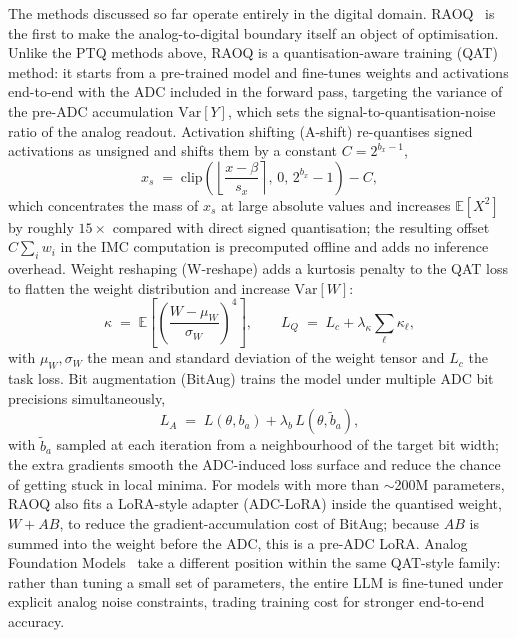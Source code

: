 \documentclass[a4paper,11pt,oneside]{article}
\theoremstyle{breakstyle}
\begin{document}
The methods discussed so far operate entirely in the digital domain.
RAOQ~\cite{RAOQ2024} is the first to make the analog-to-digital
boundary itself an object of optimisation. Unlike the PTQ methods
above, RAOQ is a quantisation-aware training (QAT) method: it starts
from a pre-trained model and fine-tunes weights and activations
end-to-end with the ADC included in the forward pass, targeting the
variance of the pre-ADC accumulation $\mathrm{Var}[Y]$, which sets the
signal-to-quantisation-noise ratio of the analog readout. Activation
shifting (A-shift) re-quantises signed activations as unsigned and
shifts them by a constant $C = 2^{b_x-1}$,
\begin{equation}
x_s \;=\; \mathrm{clip}\!\left(\left\lfloor\frac{x-\beta}{s_x}\right\rceil,\,0,\,2^{b_x}-1\right) - C,
\label{eq:raoq_ashift}
\end{equation}
which concentrates the mass of $x_s$ at large absolute values and
increases $\mathbb{E}[X^2]$ by roughly $15\times$ compared with direct
signed quantisation; the resulting offset $C\sum_i w_i$ in the IMC
computation is precomputed offline and adds no inference overhead.
Weight reshaping (W-reshape) adds a kurtosis penalty to the QAT loss
to flatten the weight distribution and increase $\mathrm{Var}[W]$:
\begin{equation}
\kappa \;=\; \mathbb{E}\!\left[\left(\frac{W - \mu_W}{\sigma_W}\right)^{\!4}\right],
\qquad
L_Q \;=\; L_c + \lambda_\kappa \sum_\ell \kappa_\ell,
\label{eq:raoq_kurt}
\end{equation}
with $\mu_W, \sigma_W$ the mean and standard deviation of the weight
tensor and $L_c$ the task loss. Bit augmentation (BitAug) trains the
model under multiple ADC bit precisions simultaneously,
\begin{equation}
L_A \;=\; L(\theta, b_a) + \lambda_b\, L(\theta, \tilde b_a),
\label{eq:raoq_bitaug}
\end{equation}
with $\tilde b_a$ sampled at each iteration from a neighbourhood of
the target bit width; the extra gradients smooth the ADC-induced loss
surface and reduce the chance of getting stuck in local minima. For
models with more than $\sim$200M parameters, RAOQ also fits a
LoRA-style adapter (ADC-LoRA) inside the quantised weight,
$W + AB$, to reduce the gradient-accumulation cost of BitAug; because
$AB$ is summed into the weight before the ADC, this is a pre-ADC
LoRA. Analog Foundation Models~\cite{Buechel2025AnalogFoundation}
take a different position within the same QAT-style family: rather
than tuning a small set of parameters, the entire LLM is fine-tuned
under explicit analog noise constraints, trading training cost for
stronger end-to-end accuracy.
\end{document}
